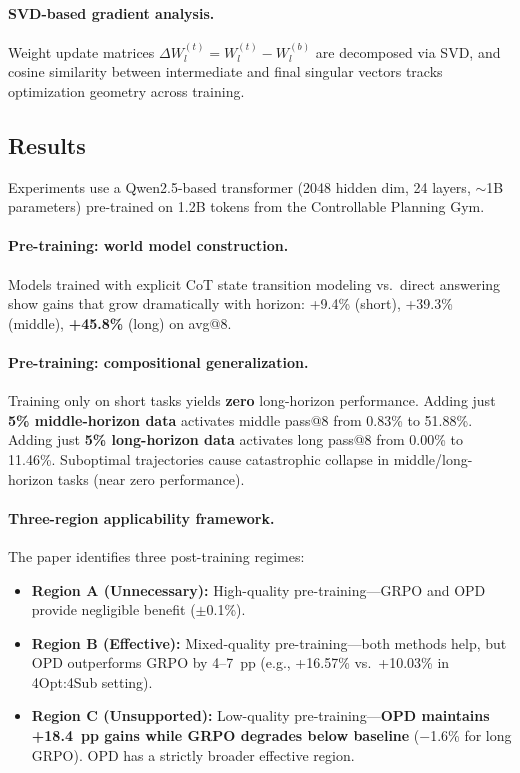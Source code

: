 \documentclass[11pt,a4paper]{article}
\begin{document}
\paragraph{SVD-based gradient analysis.}
Weight update matrices $\Delta W_l^{(t)} = W_l^{(t)} - W_l^{(b)}$ are decomposed via SVD, and cosine similarity between intermediate and final singular vectors tracks optimization geometry across training.

\subsection{Results}

Experiments use a Qwen2.5-based transformer (2048 hidden dim, 24 layers, $\sim$1B parameters) pre-trained on 1.2B tokens from the Controllable Planning Gym.

\paragraph{Pre-training: world model construction.}
Models trained with explicit CoT state transition modeling vs.\ direct answering show gains that grow dramatically with horizon: +9.4\% (short), +39.3\% (middle), \textbf{+45.8\%} (long) on avg@8.

\paragraph{Pre-training: compositional generalization.}
Training only on short tasks yields \textbf{zero} long-horizon performance. Adding just \textbf{5\% middle-horizon data} activates middle pass@8 from 0.83\% to 51.88\%. Adding just \textbf{5\% long-horizon data} activates long pass@8 from 0.00\% to 11.46\%. Suboptimal trajectories cause catastrophic collapse in middle/long-horizon tasks (near zero performance).

\paragraph{Three-region applicability framework.}
The paper identifies three post-training regimes:
\begin{itemize}
    \item \textbf{Region A (Unnecessary):} High-quality pre-training---GRPO and OPD provide negligible benefit ($\pm$0.1\%).
    \item \textbf{Region B (Effective):} Mixed-quality pre-training---both methods help, but OPD outperforms GRPO by 4--7~pp (e.g., +16.57\% vs.\ +10.03\% in 4Opt:4Sub setting).
    \item \textbf{Region C (Unsupported):} Low-quality pre-training---\textbf{OPD maintains +18.4~pp gains while GRPO degrades below baseline} ($-$1.6\% for long GRPO). OPD has a strictly broader effective region.
\end{itemize}
\end{document}
